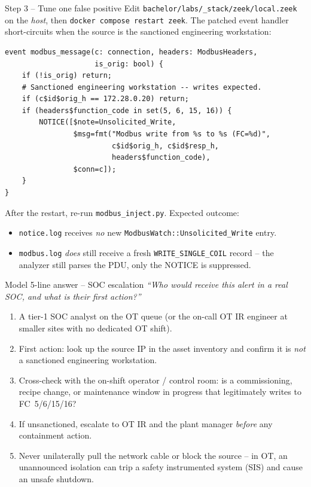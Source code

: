 \documentclass[11pt,a4paper]{article}
\begin{document}
\begin{solutionbox}{Step 3 -- Tune one false positive}
Edit \texttt{bachelor/labs/\_stack/zeek/local.zeek} on the
\emph{host}, then \texttt{docker compose restart zeek}. The patched
event handler short-circuits when the source is the sanctioned
engineering workstation:
\begin{lstlisting}
event modbus_message(c: connection, headers: ModbusHeaders,
                     is_orig: bool) {
    if (!is_orig) return;
    # Sanctioned engineering workstation -- writes expected.
    if (c$id$orig_h == 172.28.0.20) return;
    if (headers$function_code in set(5, 6, 15, 16)) {
        NOTICE([$note=Unsolicited_Write,
                $msg=fmt("Modbus write from %s to %s (FC=%d)",
                         c$id$orig_h, c$id$resp_h,
                         headers$function_code),
                $conn=c]);
    }
}
\end{lstlisting}
After the restart, re-run \texttt{modbus\_inject.py}. Expected outcome:
\begin{itemize}[leftmargin=*, nosep]
  \item \texttt{notice.log} receives \emph{no} new
        \texttt{ModbusWatch::Unsolicited\_Write} entry.
  \item \texttt{modbus.log} \emph{does} still receive a fresh
        \texttt{WRITE\_SINGLE\_COIL} record -- the analyzer still parses
        the PDU, only the NOTICE is suppressed.
\end{itemize}
\end{solutionbox}

\begin{solutionbox}{Model 5-line answer -- SOC escalation}
\emph{``Who would receive this alert in a real SOC, and what is their
first action?''}
\begin{enumerate}[leftmargin=*, nosep]
  \item A tier-1 SOC analyst on the OT queue (or the on-call OT IR
        engineer at smaller sites with no dedicated OT shift).
  \item First action: look up the source IP in the asset inventory and
        confirm it is \emph{not} a sanctioned engineering workstation.
  \item Cross-check with the on-shift operator / control room: is a
        commissioning, recipe change, or maintenance window in progress
        that legitimately writes to FC~5/6/15/16?
  \item If unsanctioned, escalate to OT IR and the plant manager
        \emph{before} any containment action.
  \item Never unilaterally pull the network cable or block the source
        -- in OT, an unannounced isolation can trip a safety
        instrumented system (SIS) and cause an unsafe shutdown.
\end{enumerate}
\end{solutionbox}
\end{document}
